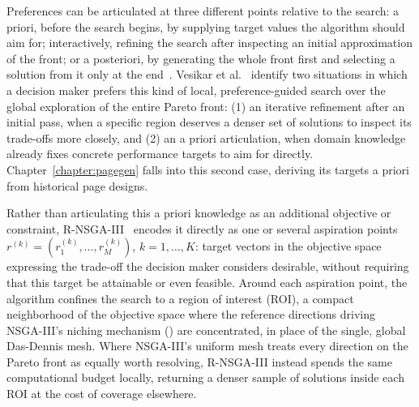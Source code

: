 Preferences can be articulated at three different points relative to the search: a priori, before the search begins, by supplying target values the algorithm should aim for; interactively, refining the search after inspecting an initial approximation of the front; or a posteriori, by generating the whole front first and selecting a solution from it only at the end~\cite{rnsga-iii}. Vesikar et al.~\cite{rnsga-iii} identify two situations in which a decision maker prefers this kind of local, preference-guided search over the global exploration of the entire Pareto front: (1) an iterative refinement after an initial pass, when a specific region deserves a denser set of solutions to inspect its trade-offs more closely, and (2) an a priori articulation, when domain knowledge already fixes concrete performance targets to aim for directly. Chapter~\ref{chapter:pagegen} falls into this second case, deriving its targets a priori from historical page designs.

Rather than articulating this a priori knowledge as an additional objective or constraint, R-NSGA-III~\cite{rnsga-iii} encodes it directly as one or several aspiration points $r^{(k)} = (r_1^{(k)}, \dots, r_M^{(k)})$, $k = 1, \dots, K$: target vectors in the objective space expressing the trade-off the decision maker considers desirable, without requiring that this target be attainable or even feasible. Around each aspiration point, the algorithm confines the search to a region of interest (ROI), a compact neighborhood of the objective space where the reference directions driving NSGA-III's niching mechanism () are concentrated, in place of the single, global Das-Dennis mesh. Where NSGA-III's uniform mesh treats every direction on the Pareto front as equally worth resolving, R-NSGA-III instead spends the same computational budget locally, returning a denser sample of solutions inside each ROI at the cost of coverage elsewhere.

